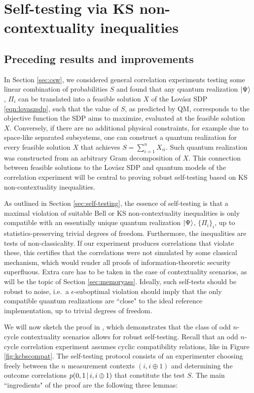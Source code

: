 \chapter{Self-testing via KS non-contextuality inequalities}
\label{sec:contselftesting}

\section{Preceding results and improvements}

In Section \ref{sec:csw}, we considered general correlation experiments testing some linear combination of probabilities $S$ and found that any quantum realization $\ket{\Psi}$, $\Pi_i$ can be translated into a feasible solution $X$ of the Lovász SDP \ref{eqn:lovaszsdp}, such that the value of $S$, as predicted by QM, corresponds to the objective function the SDP aims to maximize, evaluated at the feasible solution $X$. Conversely, if there are no additional physical constraints, for example due to space-like separated subsystems, one can construct a quantum realization for every feasible solution $X$ that achieves $S=\sum_{i=1}^n X_{ii}$. Such quantum realization was constructed from an arbitrary Gram decomposition of $X$. This connection between feasible solutions to the Lovász SDP and quantum models of the correlation experiment will be central to proving robust self-testing based on KS non-contextuality inequalities.

As outlined in Section \ref{sec:self-testing}, the essence of self-testing is that a maximal violation of suitable Bell or KS non-contextuality inequalities is only compatible with an essentially unique quantum realization $\ket{\Psi}$, $\{\Pi_i\}_i$, up to statistics-preserving trivial degrees of freedom. Furthermore, the inequalities are tests of non-classicality. If our experiment produces correlations that violate these, this certifies that the correlations were not simulated by some classical mechanism, which would render all proofs of information-theoretic security superfluous. Extra care has to be taken in the case of contextuality scenarios, as will be the topic of Section \ref{sec:memoryass}. Ideally, such self-tests should be robust to noise, i.e.\ a $\epsilon$-suboptimal violation should imply that the only compatible quantum realizations are ``close" to the ideal reference implementation, up to trivial degrees of freedom.

We will now sketch the proof in \cite{Bharti2019}, which demonstrates that the class of odd $n$-cycle contextuality scenarios allows for robust self-testing. Recall that an odd $n$-cycle correlation experiment assumes cyclic compatibility relations, like in Figure \ref{fig:kcbscompat}. The self-testing protocol consists of an experimenter choosing freely between the $n$ measurement contexts $(i,i\oplus1)$ and determining the outcome correlations $p(0,1\thinspace\vert\thinspace i,i\oplus 1)$ that constitute the test $S$. The main ``ingredients" of the proof are the following three lemmas:

